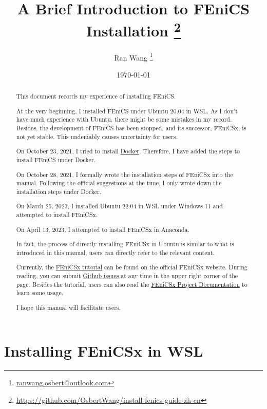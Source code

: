\documentclass{report}
\title{\bfseries A Brief Introduction to FEniCS Installation%
	\thanks{\url{https://github.com/OsbertWang/install-fenics-guide-zh-cn}}%
}
\author{Ran Wang%
	\thanks{\href{mailto:ranwang.osbert@outlook.com}%
		{\ttfamily ranwang.osbert@outlook.com}}%
}
\date{\today}
\begin{document}
	
	\maketitle
	
	\begin{abstract}
		
		This document records my experience of installing FEniCS.
		
		At the very beginning, I installed FEniCS under Ubuntu 20.04 in WSL. As I don't have much experience with Ubuntu, there might be some mistakes in my record. Besides, the development of FEniCS has been stopped, and its successor, FEniCSx, is not yet stable. This undeniably causes uncertainty for users.
		
		On October 23, 2021, I tried to install \href{https://www.docker.com/get-started}{Docker}. Therefore, I have added the steps to install FEniCS under Docker.
		
		On October 28, 2021, I formally wrote the installation steps of FEniCSx into the manual. Following the official suggestions at the time, I only wrote down the installation steps under Docker.
		
		On March 25, 2023, I installed Ubuntu 22.04 in WSL under Windows 11 and attempted to install FEniCSx.
		
		On April 13, 2023, I attempted to install FEniCSx in Anaconda.
		
		In fact, the process of directly installing FEniCSx in Ubuntu is similar to what is introduced in this manual, users can directly refer to the relevant content.
		
		Currently, the \href{https://jsdokken.com/dolfinx-tutorial/}{FEniCSx tutorial} can be found on the official FEniCSx website. During reading, you can submit \href{https://github.com/jorgensd/ dolfinx-tutorial/issues/new?title=Issue%20on%20page%20%2Findex.html& body=Your%20issue%20content%20here.}{Github issues} at any time in the upper right corner of the page. Besides the tutorial, users can also read the \href{https://docs.fenicsproject.org/}{FEniCSx Project Documentation} to learn some usage.
		
		I hope this manual will facilitate users.
	\end{abstract}

\tableofcontents

\chapter{Installing FEniCSx in WSL}
\end{document}
